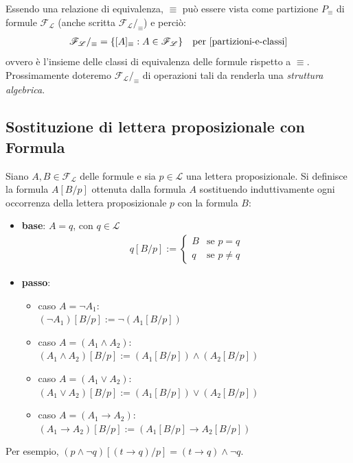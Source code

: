 Essendo una relazione di equivalenza, $\equiv$ può essere vista come partizione $P_{\equiv}$ di formule $\mathscr{F_L}$ (anche scritta $\mathscr{F_L}/_{\equiv}$) e perciò:
\begin{align*}
\mathscr{F_L}/_{\equiv} = \{ [A]_{\equiv} : A \in \mathscr{F_L} \} & & \text{per \ref{partizioni-e-classi}}
\end{align*}
ovvero è l'insieme delle classi di equivalenza delle formule rispetto a $\equiv$.\\
Prossimamente doteremo $\mathscr{F_L}/_{\equiv}$ di operazioni tali da renderla una \textit{struttura algebrica}.

\subsection{Sostituzione di lettera proposizionale con Formula}
\begin{defi}
\label{def:sostituzione}
  Siano $A, B \in \mathscr{F_L}$ delle formule e sia $p \in \mathscr{L}$ una lettera proposizionale.
  Si definisce la formula $A[B/p]$ ottenuta dalla formula $A$ sostituendo induttivamente ogni occorrenza della lettera proposizionale $p$ con la formula $B$:
  \begin{itemize}
    \item \textbf{base}: $A = q$, con $q \in \mathscr{L}$
      \begin{align*}
        q [B/p] := 
        \begin{cases}
          B & \text{se } p = q \\
          q & \text{se } p \neq q 
        \end{cases}
      \end{align*}
    \item \textbf{passo}:
      \begin{itemize}
        \item caso $A = \neg A_1$: \\
          $(\neg A_1)[B/p] := \neg(A_1[B/p])$
        \item caso $A = (A_1 \land A_2)$: \\
          $(A_1 \land A_2)[B/p] := (A_1[B/p]) \land (A_2[B/p])$
        \item caso $A = (A_1 \lor A_2)$: \\
          $(A_1 \lor A_2)[B/p] := (A_1[B/p]) \lor (A_2[B/p])$
        \item caso $A = (A_1 \rightarrow A_2)$: \\
          $(A_1 \rightarrow A_2)[B/p] := (A_1[B/p] \rightarrow A_2[B/p])$
      \end{itemize}
  \end{itemize}
\end{defi}
Per esempio, $(p \land \neg q) [(t \rightarrow q)/p] = (t\rightarrow q) \land \neg q$.

